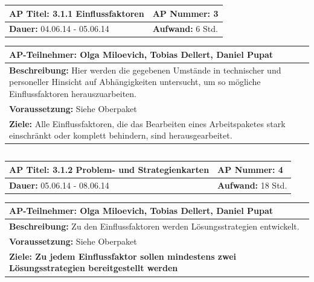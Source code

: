 \documentclass[fontsize=12pt,paper=a4,twoside]{scrartcl}
\begin{document}
\begin{tabular}{|p{7.43cm}|p{7.43cm}|}
\hline
\textbf{AP Titel: }3.1.1 Einflussfaktoren & \textbf{AP Nummer: }3\\ 
\hline
\textbf{Dauer: }04.06.14 - 05.06.14& \textbf{Aufwand: }6 Std.\\
\hline
\end{tabular}
\begin{tabular}{|p{15.3cm}|}
\hline
\textbf{AP-Teilnehmer: }Olga Miloevich, Tobias Dellert, Daniel Pupat\\
\hline
\textbf{Beschreibung: }Hier werden die gegebenen Umstände in technischer und personeller Hinsicht auf Abhängigkeiten untersucht, um so mögliche Einflussfaktoren herauszuarbeiten.\\
\hline
\textbf{Voraussetzung: }Siehe Oberpaket\\
\hline 
\textbf{Ziele: }Alle Einflussfaktoren, die das Bearbeiten eines Arbeitspaketes stark einschränkt oder komplett behindern, sind herausgearbeitet.  \\
\hline 
\end{tabular}
\begin{verbatim}

\end{verbatim}

\begin{tabular}{|p{7.43cm}|p{7.43cm}|}
\hline
\textbf{AP Titel: }3.1.2 Problem- und Strategienkarten & \textbf{AP Nummer: }4\\ 
\hline
\textbf{Dauer: }05.06.14 - 08.06.14& \textbf{Aufwand: }18 Std.\\
\hline
\end{tabular}
\begin{tabular}{|p{15.3cm}|}
\hline
\textbf{AP-Teilnehmer: }Olga Miloevich, Tobias Dellert, Daniel Pupat\\
\hline
\textbf{Beschreibung: }Zu den Einflussfaktoren werden Lösungsstrategien entwickelt. \\
\hline
\textbf{Voraussetzung: }Siehe Oberpaket\\
\hline 
\textbf{Ziele: Zu jedem Einflussfaktor sollen mindestens zwei Lösungsstrategien bereitgestellt werden}\\
\hline 
\end{tabular}
\begin{verbatim}

\end{verbatim}
\end{document}
